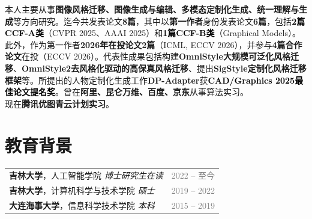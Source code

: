 \documentclass{resume}
\begin{document}

\ResumeTitle

\noindent
\begin{tcolorbox}[colback=gray!5!white, colframe=gray!30!white, boxrule=0.3pt, sharp corners, before skip=4pt, after skip=6pt, title={\textbf{过往个人总结}}]
本人主要从事\textbf{图像风格迁移、图像生成与编辑、多模态定制化生成、统一理解与生成}等方向研究。迄今共发表论文\textbf{8篇}，其中以\textbf{第一作者}身份发表论文\textbf{6篇}，包括\textcolor{black}{\textbf{2篇CCF-A类}}（CVPR 2025、AAAI 2025）和\textcolor{black}{\textbf{1篇CCF-B类}}（Graphical Models）。此外，作为第一作者\textbf{2026年在投论文2篇}（ICML, ECCV 2026），并参与\textbf{4篇合作论文}在投（ECCV 2026）。代表性成果包括构建\textbf{OmniStyle大规模可泛化风格迁移}、\textbf{OmniStyle2去风格化驱动的高保真风格迁移}、提出\textbf{SigStyle定制化风格迁移框架}等。所提出的人物定制化生成工作\textbf{DP-Adapter}获\textcolor{black}{\textbf{CAD/Graphics 2025最佳论文提名奖}}。曾在\textbf{阿里、昆仑万维、百度、京东}从事算法实习。 \\
现在\textbf{腾讯优图青云计划实习}。
\end{tcolorbox}


\section{\textbf{教育背景}}
\noindent
\begin{tabularx}{\linewidth}{@{}X r@{}}
  \textbf{吉林大学}，人工智能学院 \quad\textit{博士研究生在读}
    & \textcolor{gray}{2022 -- 至今} \\[0.2em]
  \textbf{吉林大学}，计算机科学与技术学院 \quad\textit{硕士}
    & \textcolor{gray}{2019 -- 2022} \\[0.2em]
  \textbf{大连海事大学}，信息科学技术学院 \quad\textit{本科}
    & \textcolor{gray}{2015 -- 2019} \\
\end{tabularx}

\vspace{5pt}
\end{document}
